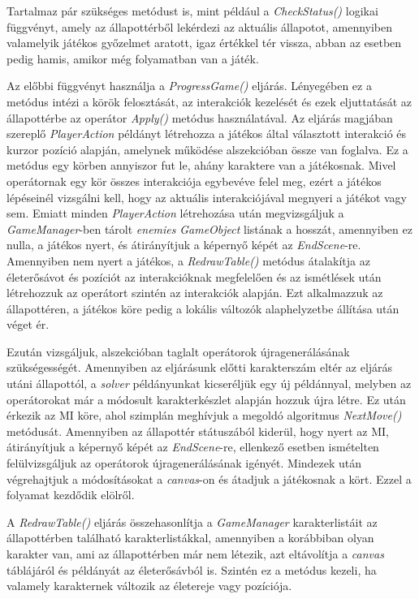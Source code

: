 \documentclass[
]{thesis-ekf}
\theoremstyle{definition}
\theoremstyle{remark}
\begin{document}
Tartalmaz pár szükséges metódust is, mint például a \emph{CheckStatus()} logikai függvényt, amely az állapottérből lekérdezi az aktuális állapotot, amennyiben valamelyik játékos győzelmet aratott, igaz értékkel tér vissza, abban az esetben pedig hamis, amikor még folyamatban van a játék. 

Az előbbi függvényt használja a \emph{ProgressGame()} eljárás. Lényegében ez a metódus intézi a körök felosztását, az interakciók kezelését és ezek eljuttatását az állapottérbe az operátor \emph{Apply()} metódus használatával. Az eljárás magjában szereplő \emph{PlayerAction} példányt létrehozza a játékos által választott interakció és kurzor pozíció alapján, amelynek működése  alszekcióban össze van foglalva. Ez a metódus egy körben annyiszor fut le, ahány karaktere van a játékosnak. Mivel operátornak egy kör összes interakciója egybevéve felel meg, ezért a játékos lépéseinél vizsgálni kell, hogy az aktuális interakciójával megnyeri a játékot vagy sem. Emiatt minden \emph{PlayerAction} létrehozása után megvizsgáljuk a \emph{GameManager}-ben tárolt \emph{enemies} \emph{GameObject} listának a hosszát, amennyiben ez nulla, a játékos nyert, és átirányítjuk a képernyő képét az \emph{EndScene}-re. Amennyiben nem nyert a játékos, a \emph{RedrawTable()} metódus átalakítja az életerősávot és pozíciót az interakcióknak megfelelően és az ismétlések után létrehozzuk az operátort szintén az interakciók alapján. Ezt alkalmazzuk az állapottéren, a játékos köre pedig a lokális változók alaphelyzetbe állítása után véget ér. 

Ezután vizsgáljuk,  alszekcióban taglalt operátorok újragenerálásának szükségességét. Amennyiben az eljárásunk előtti karakterszám eltér az eljárás utáni állapottól, a \emph{solver} példányunkat kicseréljük egy új példánnyal, melyben az operátorokat már a módosult karakterkészlet alapján hozzuk újra létre. Ez után érkezik az MI köre, ahol szimplán meghívjuk a megoldó algoritmus \emph{NextMove()} metódusát. Amennyiben az állapottér státuszából kiderül, hogy nyert az MI, átirányítjuk a képernyő képét az \emph{EndScene}-re, ellenkező esetben ismételten felülvizsgáljuk az operátorok újragenerálásának igényét. Mindezek után végrehajtjuk a módosításokat a \emph{canvas}-on és átadjuk a játékosnak a kört. Ezzel a folyamat kezdődik elölről.

A \emph{RedrawTable()} eljárás összehasonlítja a \emph{GameManager} karakterlistáit az állapottérben található karakterlistákkal, amennyiben a korábbiban olyan karakter van, ami az állapottérben már nem létezik, azt eltávolítja a \emph{canvas} táblájáról és példányát az életerősávból is. Szintén ez a metódus kezeli, ha valamely karakternek változik az életereje vagy pozíciója.
\end{document}
